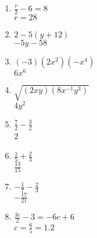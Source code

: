 \documentclass[12pt]{article}
\begin{document}
\begin{multicols}{2}
\begin{enumerate}
	\item \( \frac{r}{2} - 6 = 8 \) \\
		\( r = 28 \)

	\item \( 2 - 5(y + 12) \) \\
		\( -5y -58 \)

	\item \( (-3)(2x^{2})(-x^{4}) \) \\
		\( 6x^{6} \)

	\item \( \sqrt{(2xy)(8x^{-1}y^{3})} \) \\
		\( 4y^{2} \)

	\item \( \frac{7}{2} - \frac{3}{2} \) \\
		2

	\item \( \frac{1}{5} + \frac{2}{3} \) \\
		\( \frac{13}{15} \)

	\item \( -\frac{1}{7} - \frac{2}{3} \) \\
		\( -\frac{17}{21} \)

	\item \( \frac{3c}{2} - 3 = -6c + 6 \) \\
		\( c = \frac{6}{5} = 1.2 \)

\end{enumerate}
\end{multicols}

\pagebreak

\large
\end{document}
